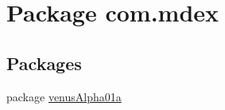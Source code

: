 \hypertarget{namespacecom_1_1mdex}{}\section{Package com.\+mdex}
\label{namespacecom_1_1mdex}
\subsection*{Packages}
\begin{DoxyCompactItemize}
\item 
package \hyperlink{namespacecom_1_1mdex_1_1venus_alpha01a}{venus\+Alpha01a}
\end{DoxyCompactItemize}
